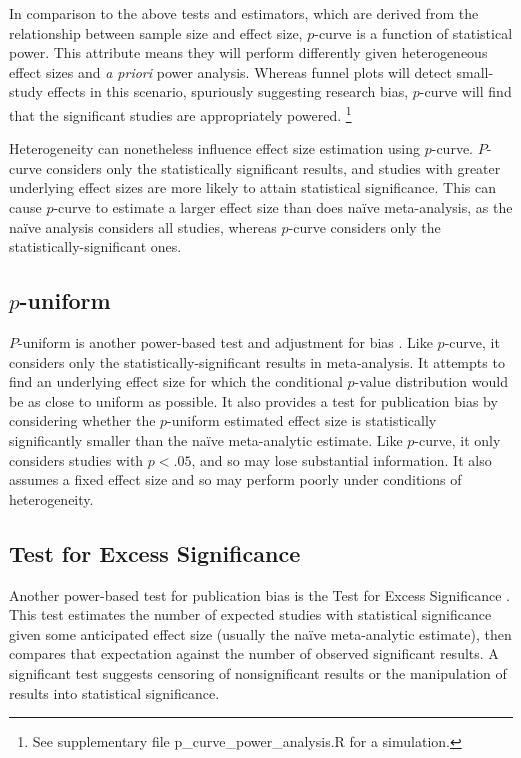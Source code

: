 \documentclass[man, mask]{apa6}
\begin{document}
In comparison to the above tests and estimators, which are derived from the relationship between sample size and effect size, $p$-curve is a function of statistical power. This attribute means they will perform differently given heterogeneous effect sizes and {\em a priori} power analysis. Whereas funnel plots will detect small-study effects in this scenario, spuriously suggesting research bias, $p$-curve will find that the significant studies are appropriately powered. \footnote{See supplementary file p\_curve\_power\_analysis.R for a simulation.}

Heterogeneity can nonetheless influence effect size estimation using $p$-curve. $P$-curve considers only the statistically significant results, and studies with greater underlying effect sizes are more likely to attain statistical significance. This can cause $p$-curve to estimate a larger effect size than does na{\"i}ve meta-analysis, as the na{\"i}ve analysis considers all studies, whereas $p$-curve considers only the statistically-significant ones. 

\subsection{$p$-uniform}
$P$-uniform is another power-based test and adjustment for bias \citep{VanAssen:etal:2015}. Like $p$-curve, it considers only the statistically-significant results in meta-analysis. It attempts to find an underlying effect size for which the conditional $p$-value distribution would be as close to uniform as possible. It also provides a test for publication bias by considering whether the $p$-uniform estimated effect size is statistically significantly smaller than the na{\"i}ve meta-analytic estimate. Like $p$-curve, it only considers studies with $p < .05$, and so may lose substantial information. It also assumes a fixed effect size and so may perform poorly under conditions of heterogeneity.

\subsection{Test for Excess Significance}
Another power-based test for publication bias is the Test for Excess Significance \citep{Ioannidis:Trikalinos:2007}. This test estimates the number of expected studies with statistical significance given some anticipated effect size (usually the na{\"i}ve meta-analytic estimate), then compares that expectation against the number of observed significant results. A significant test suggests censoring of nonsignificant results or the manipulation of results into statistical significance.
\end{document}
